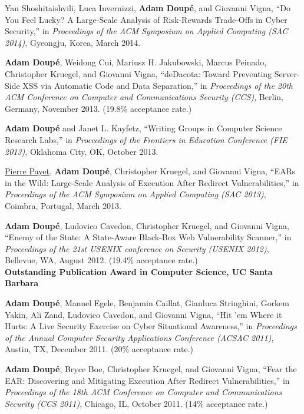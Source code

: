 \documentclass[11pt,letterpaper,sans]{moderncv}
\begin{document}
\begin{etaremune}
\item Yan Shoshitaishvili, Luca Invernizzi, \textbf{Adam Doup\'e}, and
  Giovanni Vigna, ``Do You Feel Lucky? A Large-Scale Analysis of
  Risk-Rewards Trade-Offs in Cyber Security,'' in \emph{Proceedings of
    the ACM Symposium on Applied Computing (SAC 2014)}, Gyeongju,
  Korea, March 2014.

\item \textbf{Adam Doup\'e}, Weidong Cui, Mariusz H. Jakubowski,
  Marcus Peinado, Christopher Kruegel, and Giovanni Vigna, ``deDacota:
  Toward Preventing Server-Side XSS via Automatic Code and Data
  Separation,'' in \emph{Proceedings of the 20th ACM Conference on
    Computer and Communications Security (CCS)}, Berlin, Germany,
  November 2013. (19.8\% acceptance rate.)

\item \textbf{Adam Doup\'e} and Janet L. Kayfetz, ``Writing Groups in
  Computer Science Research Labs,'' in \emph{Proceedings of the
    Frontiers in Education Conference (FIE 2013)}, Oklahoma City, OK,
  October 2013.

\item \underline{Pierre Payet}, \textbf{Adam Doup\'e}, Christopher
  Kruegel, and Giovanni Vigna, ``EARs in the Wild: Large-Scale
  Analysis of Execution After Redirect Vulnerabilities,'' in
  \emph{Proceedings of the ACM Symposium on Applied Computing (SAC
    2013)}, Coimbra, Portugal, March 2013.

\item \textbf{Adam Doup\'e}, Ludovico Cavedon, Christopher Kruegel,
  and Giovanni Vigna, ``Enemy of the State: A State-Aware Black-Box
  Web Vulnerability Scanner,'' in \emph{Proceedings of the 21st USENIX
    conference on Security (USENIX 2012)}, Bellevue, WA, August 2012.
  (19.4\% acceptance rate.) \\
  \textbf{Outstanding Publication Award in Computer
  Science, UC Santa Barbara}

\item \textbf{Adam Doup\'e}, Manuel Egele, Benjamin Caillat, Gianluca
  Stringhini, Gorkem Yakin, Ali Zand, Ludovico Cavedon, and Giovanni
  Vigna, ``Hit 'em Where it Hurts: A Live Security Exercise on Cyber
  Situational Awareness,'' in \emph{Proceedings of the Annual Computer
    Security Applications Conference (ACSAC 2011)}, Austin, TX,
  December 2011. (20\% acceptance rate.)

\item \textbf{Adam Doup\'e}, Bryce Boe, Christopher Kruegel, and
  Giovanni Vigna, ``Fear the EAR: Discovering and Mitigating Execution
  After Redirect Vulnerabilities,'' in \emph{Proceedings of the 18th
    ACM Conference on Computer and Communications Security (CCS
    2011)}, Chicago, IL, October 2011. (14\% acceptance rate.)


\end{etaremune}
\end{document}
